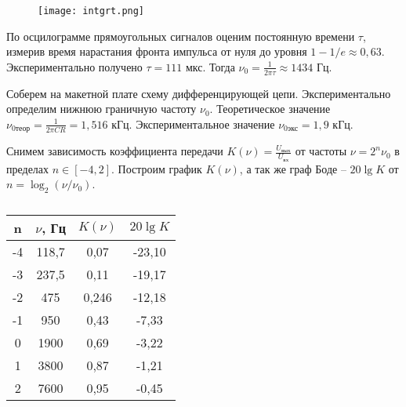 	\begin{figure}[h!]
		\centering
		\texttt{[image: intgrt.png]}
		\caption{}
	\end{figure}
	
	
	\noindent По осцилограмме прямоугольных сигналов оценим постоянную времени $\tau$,
	измерив время нарастания фронта импульса от нуля до уровня $1 - 1/e \approx 0,63$.
	\vspace*{5mm}
	\noindent Экспериментально получено $\tau = 111$ мкс. Тогда $\nu_0 = \frac{1}{2 \pi \tau} \approx 1434$ Гц.
	
	
	\noindent Соберем на макетной плате схему дифференцирующей цепи. Экспериментально определим нижнюю граничную частоту $\nu_0$.
	\vspace*{5mm}
	\noindent Теоретическое значение $\nu_{\text{0теор}} = \frac{1}{2 \pi C R} = 1,516$ кГц. Экспериментальное значение $\nu_{\text{0экс}} = 1,9$ кГц.
	
	
	\noindent Снимем зависимость коэффициента передачи $K(\nu) = \frac{U_{\text{вых}}}{U_{\text{вх}}}$ от частоты $\nu = 2^n \nu_0$ в пределах $n \in [-4, 2]$. Построим график $K(\nu)$, а так же граф Боде -- $20 \lg K$ от$n = \log_2 (\nu / \nu_0)$.
	
	
	\begin{table}[h!]
		\begin{center}
			\begin{tabular}{|c|c|c|c|}
				\hline
				n  & $\nu$, Гц & $K(\nu)$ & $20 \lg K$  \\ \hline
				-4 & 118,7     & 0,07     & -23,10 \\ \hline
				-3 & 237,5     & 0,11     & -19,17 \\ \hline
				-2 & 475       & 0,246    & -12,18 \\ \hline
				-1 & 950       & 0,43     & -7,33  \\ \hline
				0  & 1900      & 0,69     & -3,22  \\ \hline
				1  & 3800      & 0,87     & -1,21  \\ \hline
				2  & 7600      & 0,95     & -0,45  \\ \hline
			\end{tabular}
		\end{center}
		\caption{}
	\end{table}
	
